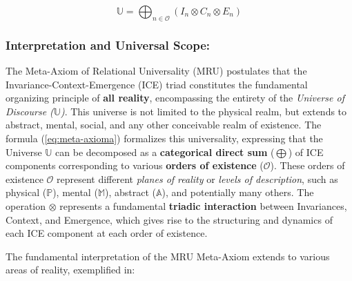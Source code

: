 \documentclass{article}
\begin{document}
\begin{equation}
\boxed{\mathbb{U} = \bigoplus_{n \in\mathcal{O}} (I_n\otimes C_n \otimes E_n) }
\label{eq:meta-axioma}
\end{equation}

\bigskip

\subsubsection{Interpretation and Universal Scope:}
The Meta-Axiom of Relational Universality (MRU) postulates that the Invariance-Context-Emergence (ICE) triad constitutes the fundamental organizing principle of \textbf{all reality}, encompassing the entirety of the \emph{Universe of Discourse ($\mathbb{U}$)}. This universe is not limited to the physical realm, but extends to abstract, mental, social, and any other conceivable realm of existence. The formula (\ref{eq:meta-axioma}) formalizes this universality, expressing that the Universe $\mathbb{U}$ can be decomposed as a \textbf{categorical direct sum} ($\bigoplus$) of ICE components corresponding to various \textbf{orders of existence} ($\mathcal{O}$). These orders of existence $\mathcal{O}$ represent different \emph{planes of reality} or \emph{levels of description}, such as physical ($\mathbb{P}$), mental ($\mathbb{M}$), abstract ($\mathbb{A}$), and potentially many others. The operation $\otimes$ represents a fundamental \textbf{triadic interaction} between Invariances, Context, and Emergence, which gives rise to the structuring and dynamics of each ICE component at each order of existence.

\bigskip

The fundamental interpretation of the MRU Meta-Axiom extends to various areas of reality, exemplified in:
\end{document}
